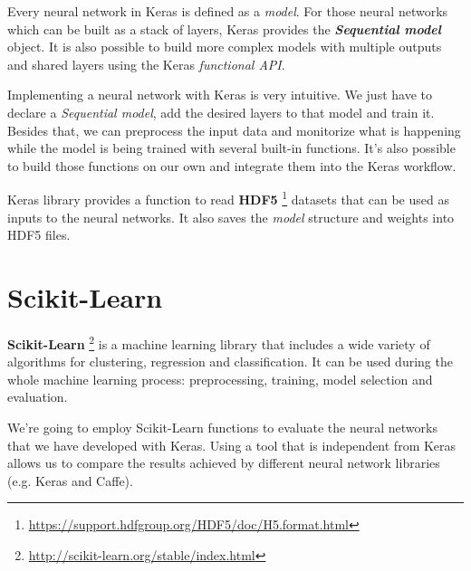 Every neural network in Keras is defined as a \textit{model}. For those neural networks which can be built as a stack of layers, Keras provides the \textit{\textbf{Sequential model}} object. It is also possible to build more complex models with multiple outputs and shared layers using the Keras \textit{functional API}.

Implementing a neural network with Keras is very intuitive. We just have to declare a \textit{Sequential model}, add the desired layers to that model and train it. Besides that, we can preprocess the input data and monitorize what is happening while the model is being trained with several built-in functions. It's also possible to build those functions on our own and integrate them into the Keras workflow.

Keras library provides a function to read \textbf{HDF5} \footnote{\url{https://support.hdfgroup.org/HDF5/doc/H5.format.html}} datasets that can be used as inputs to the neural networks. It also saves the \textit{model} structure and weights into HDF5 files.

\section{Scikit-Learn}
\textbf{Scikit-Learn} \footnote{\url {http://scikit-learn.org/stable/index.html}} is a machine learning library that includes a wide variety of algorithms for clustering, regression and classification. It can be used during the whole machine learning process: preprocessing, training, model selection and evaluation.

We're going to employ Scikit-Learn functions to evaluate the neural networks that we have developed with Keras. Using a tool that is independent from Keras allows us to compare the results achieved by different neural network libraries (e.g. Keras and Caffe).

